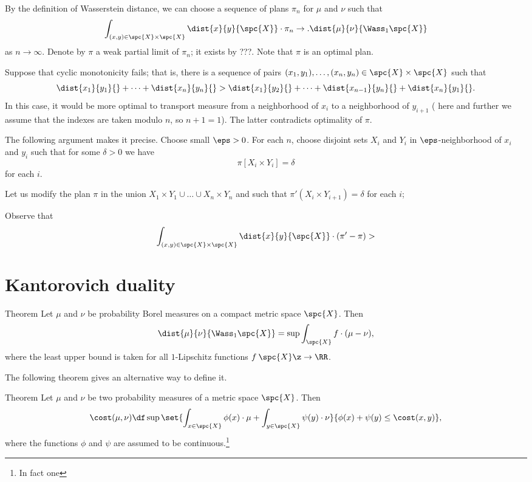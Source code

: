 By the definition of Wasserstein distance, we can choose a sequence of plans $\pi_n$ for $\mu$ and $\nu$ such that 
\[\int_{(x,y)\in\spc{X}\times\spc{X}}\dist{x}{y}{\spc{X}}\cdot\pi_n\to .\dist{\mu}{\nu}{\Wass_1\spc{X}}\]
as $n\to \infty$.
Denote by $\pi$ a weak partial limit of $\pi_n$;
it exists by ???.
Note that $\pi$ is an optimal plan.

Suppose that cyclic monotonicity fails;
that is, there is a sequence of pairs $(x_1,y_1),\dots,(x_n,y_n)\in\spc{X}\times\spc{X}$ such that
\[\dist{x_1}{y_1}{}+\dots+\dist{x_n}{y_n}{}
>
\dist{x_1}{y_2}{}+\dots+\dist{x_{n-1}}{y_n}{}+\dist{x_{n}}{y_1}{}.\]
In this case, it would be more optimal to transport measure from a neighborhood of $x_i$ to a neighborhood of $y_{i+1}$ (
here and further we assume that the indexes are taken modulo $n$, so $n+1=1$).
The latter contradicts optimality of $\pi$.

The following argument makes it precise.
Choose small $\eps>0$.
For each $n$,
choose disjoint sets $X_i$ and $Y_i$ in $\eps$-neighborhood of $x_i$ and $y_i$
such that for some $\delta>0$ we have 
\[\pi [X_i\times Y_i]=\delta\]
for each $i$.

Let us modify the plan $\pi$ in the union $X_1\times Y_1 \cup\dots\cup X_n\times Y_n$ and such that 
$\pi'(X_i\times Y_{i+1})=\delta$ for each $i$;


Observe that
\[\int_{(x,y)\in\spc{X}\times\spc{X}}\dist{x}{y}{\spc{X}}\cdot(\pi'-\pi)>\]
\qeds


\section{Kantorovich duality}


\begin{thm}{Theorem}
Let $\mu$ and $\nu$ be probability Borel measures on a compact metric space $\spc{X}$.
Then
\[\dist{\mu}{\nu}{\Wass_1\spc{X}}=\sup\int_{\spc{X}} f\cdot(\mu-\nu),\]
where the least upper bound is taken for all $1$-Lipschitz functions $f\:\spc{X}\z\to\RR$.
\end{thm}


The following theorem gives an alternative way to define it.

\begin{thm}{Theorem}
Let $\mu$ and $\nu$ be two probability measures of a metric space $\spc{X}$.
Then 
\[\cost(\mu,\nu)
\df
\sup\set{\int_{x\in\spc{X}}\phi(x)\cdot\mu+\int_{y\in\spc{X}}\psi(y)\cdot\nu}{\phi(x)+\psi(y)\le \cost(x,y)},\]
where the functions $\phi$ and $\psi$ are assumed to be continuous.\footnote{In fact one }
\end{thm}




